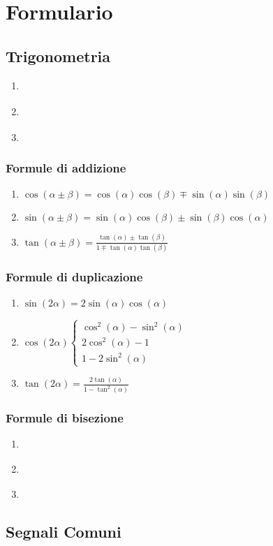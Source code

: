 \section{Formulario}
    \subsection{Trigonometria}
        \begin{enumerate}
            \item {
            }
            \item {
            }
            \item {
            }
        \end{enumerate}
        \subsubsection{Formule di addizione}
            \begin{enumerate}
                \item {
                    $\cos(\alpha \pm \beta) = \cos(\alpha)\cos(\beta) \mp \sin(\alpha)\sin(\beta)$
                }
                \item {
                    $\sin(\alpha \pm \beta) = \sin(\alpha)\cos(\beta) \pm \sin(\beta)\cos(\alpha)$
                }
                \item {
                    $\tan(\alpha \pm \beta) = \frac{\tan(\alpha) \pm \tan(\beta)}{1 \mp \tan(\alpha)\tan(\beta)} $
                }
            \end{enumerate}
        \subsubsection{Formule di duplicazione}
            \begin{enumerate}
                \item {
                    $\sin(2\alpha) =2\sin(\alpha)\cos(\alpha)$ 
                }
                \item {
                    $
                        \cos(2\alpha)
                        \begin{cases}
                            \cos^2(\alpha) - \sin^2(\alpha) \\
                            2\cos^2(\alpha)-1\\
                            1-2\sin^2(\alpha)
                        \end{cases}
                    $
                }
                \item {
                    $\tan(2\alpha) =\frac{2\tan(\alpha)}{1-\tan^2(\alpha)}$ 
                }
            \end{enumerate}
            \subsubsection{Formule di bisezione}
                \begin{enumerate}
                    \item {
                    }
                    \item {
                    }
                    \item {
                    }
                \end{enumerate}
    \subsection{Segnali Comuni}
